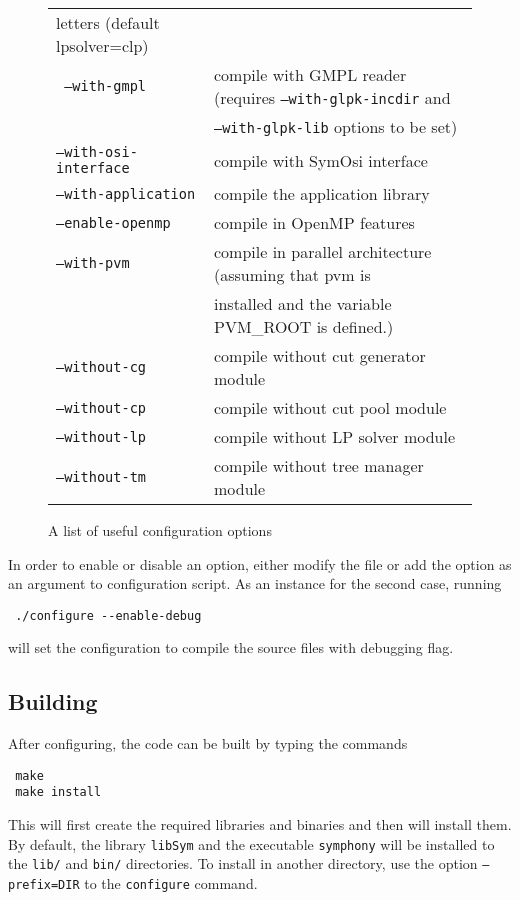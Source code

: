 \begin{figure}[htb]
\begin{tabular}{ll}
letters (default lpsolver=clp) \\
\texttt{ --with-gmpl} &  compile with GMPL reader (requires 
\texttt{--with-glpk-incdir} and \\ &
\texttt{--with-glpk-lib} options to be set) \\
\texttt{--with-osi-interface} &  compile with SymOsi interface \\
\texttt{--with-application} &  compile the application library \\
\hline
\texttt{--enable-openmp} &   compile in OpenMP features \\
\texttt{--with-pvm } &  compile in parallel architecture (assuming that pvm is \\ 
&installed and the variable PVM\_ROOT is defined.) \\
\texttt{--without-cg} &  compile without cut generator module \\
\texttt{--without-cp} &  compile without cut pool module \\
\texttt{--without-lp} &  compile without LP solver module \\
\texttt{--without-tm} &  compile without tree manager module
\end{tabular}
\caption{A list of useful configuration options \label{conf_opts}}
\end{figure}

In order to enable or disable an option, either modify the file
 or add the option as an argument to configuration
script. As an instance for the second case, running 
{\color{Brown}
\begin{verbatim}
 ./configure --enable-debug
\end{verbatim}
}
will set the configuration to compile the source files with debugging
flag. 

\subsection{Building}\label{building}

After configuring, the code can be built by typing the commands
{\color{Brown}
\begin{verbatim}
 make
 make install
\end{verbatim}
} This will first create the required libraries and binaries and then will
install them. By default, the library {\color{Brown}\texttt{libSym}} and the
executable {\color{Brown}\texttt{symphony}} will be installed to the
{\color{Brown}\texttt{lib/}} and {\color{Brown}\texttt{bin/}} directories. To
install in another directory, use the option
{\color{Brown}\texttt{--prefix=DIR}} to the {\color{Brown}\texttt{configure}}
command.

